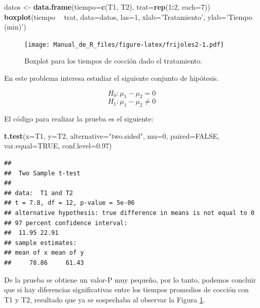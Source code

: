 \documentclass[10pt,]{krantz}
\makeatletter
\newenvironment{Shaded}{\begin{snugshade}}{\end{snugshade}}
\newcommand{\KeywordTok}[1]{\textcolor[rgb]{0.13,0.29,0.53}{\textbf{#1}}}
\newcommand{\DataTypeTok}[1]{\textcolor[rgb]{0.13,0.29,0.53}{#1}}
\newcommand{\DecValTok}[1]{\textcolor[rgb]{0.00,0.00,0.81}{#1}}
\newcommand{\FloatTok}[1]{\textcolor[rgb]{0.00,0.00,0.81}{#1}}
\newcommand{\StringTok}[1]{\textcolor[rgb]{0.31,0.60,0.02}{#1}}
\newcommand{\OtherTok}[1]{\textcolor[rgb]{0.56,0.35,0.01}{#1}}
\newcommand{\OperatorTok}[1]{\textcolor[rgb]{0.81,0.36,0.00}{\textbf{#1}}}
\newcommand{\NormalTok}[1]{#1}
\newenvironment{kframe}{%
\medskip{}
\setlength{\fboxsep}{.8em}
 \def\at@end@of@kframe{}%
 \ifinner\ifhmode%
  \def\at@end@of@kframe{\end{minipage}}%
  \begin{minipage}{\columnwidth}%
 \fi\fi%
 \def\FrameCommand##1{\hskip\@totalleftmargin \hskip-\fboxsep
 \colorbox{shadecolor}{##1}\hskip-\fboxsep
     \hskip-\linewidth \hskip-\@totalleftmargin \hskip\columnwidth}%
 \MakeFramed {\advance\hsize-\width
   \@totalleftmargin\z@ \linewidth\hsize
   \@setminipage}}%
 {\par\unskip\endMakeFramed%
 \at@end@of@kframe}
\renewenvironment{Shaded}{\begin{kframe}}{\end{kframe}}
\makeatother
\begin{document}
\begin{Shaded}
\begin{Highlighting}[]
\NormalTok{datos <-}\StringTok{ }\KeywordTok{data.frame}\NormalTok{(}\DataTypeTok{tiempo=}\KeywordTok{c}\NormalTok{(T1, T2), }\DataTypeTok{trat=}\KeywordTok{rep}\NormalTok{(}\DecValTok{1}\OperatorTok{:}\DecValTok{2}\NormalTok{, }\DataTypeTok{each=}\DecValTok{7}\NormalTok{))}
\KeywordTok{boxplot}\NormalTok{(tiempo }\OperatorTok{~}\StringTok{ }\NormalTok{trat, }\DataTypeTok{data=}\NormalTok{datos, }\DataTypeTok{las=}\DecValTok{1}\NormalTok{,}
        \DataTypeTok{xlab=}\StringTok{'Tratamiento'}\NormalTok{, }\DataTypeTok{ylab=}\StringTok{'Tiempo (min)'}\NormalTok{)}
\end{Highlighting}
\end{Shaded}

\begin{figure}
\centering
\texttt{[image: Manual\_de\_R\_files/figure-latex/frijoles2-1.pdf]}
\caption{\label{fig:frijoles2}Boxplot para los tiempos de cocción dado el
tratamiento.}
\end{figure}

En este problema interesa estudiar el siguiente conjunto de hipótesis.

\[H_0: \mu_1  - \mu_2 = 0\] \[H_1: \mu_1  - \mu_2 \neq 0\]

El código para realizar la prueba es el siguiente:

\begin{Shaded}
\begin{Highlighting}[]
\KeywordTok{t.test}\NormalTok{(}\DataTypeTok{x=}\NormalTok{T1, }\DataTypeTok{y=}\NormalTok{T2, }\DataTypeTok{alternative=}\StringTok{"two.sided"}\NormalTok{, }\DataTypeTok{mu=}\DecValTok{0}\NormalTok{, }
       \DataTypeTok{paired=}\OtherTok{FALSE}\NormalTok{, }\DataTypeTok{var.equal=}\OtherTok{TRUE}\NormalTok{, }\DataTypeTok{conf.level=}\FloatTok{0.97}\NormalTok{)}
\end{Highlighting}
\end{Shaded}

\begin{verbatim}
## 
##  Two Sample t-test
## 
## data:  T1 and T2
## t = 7.8, df = 12, p-value = 5e-06
## alternative hypothesis: true difference in means is not equal to 0
## 97 percent confidence interval:
##  11.95 22.91
## sample estimates:
## mean of x mean of y 
##     78.86     61.43
\end{verbatim}

De la prueba se obtiene un valor-P muy pequeño, por lo tanto, podemos
concluir que si hay diferencias significativas entre los tiempos
promedios de cocción con T1 y T2, resultado que ya se sospechaba al
observar la Figura \ref{fig:frijoles2}.
\end{document}

